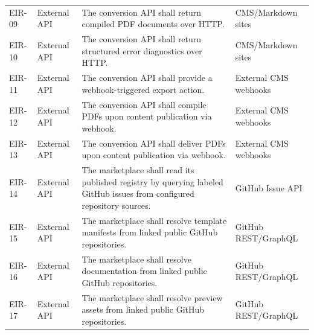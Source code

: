 \begin{xltabular}{\textwidth}{@{}p{0.12\textwidth}p{0.19\textwidth}X X@{}}
EIR-09 & External API & The conversion API shall return compiled PDF documents over HTTP. & CMS/Markdown sites \\
EIR-10 & External API & The conversion API shall return structured error diagnostics over HTTP. & CMS/Markdown sites \\
EIR-11 & External API & The conversion API shall provide a webhook-triggered export action. & External CMS webhooks \\
EIR-12 & External API & The conversion API shall compile PDFs upon content publication via webhook. & External CMS webhooks \\
EIR-13 & External API & The conversion API shall deliver PDFs upon content publication via webhook. & External CMS webhooks \\
EIR-14 & External API & The marketplace shall read its published registry by querying labeled GitHub issues from configured repository sources. & GitHub Issue API \\
EIR-15 & External API & The marketplace shall resolve template manifests from linked public GitHub repositories. & GitHub REST/GraphQL \\
EIR-16 & External API & The marketplace shall resolve documentation from linked public GitHub repositories. & GitHub REST/GraphQL \\
EIR-17 & External API & The marketplace shall resolve preview assets from linked public GitHub repositories. & GitHub REST/GraphQL \\
\end{xltabular}


